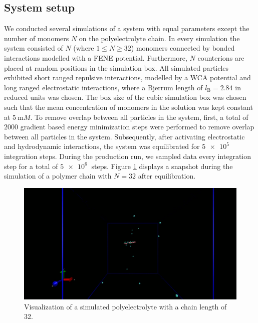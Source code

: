 \subsection{System setup}
We conducted several simulations of a system with equal parameters except the number of monomers $N$ on the polyelectrolyte chain. In every simulation the system consisted of $N$ (where $1\le N \ge 32$) monomers connected by bonded interactions modelled with a FENE potential. Furthermore, $N$ counterions are placed at random positions in the simulation box. All simulated particles exhibited short ranged repulsive interactions, modelled by a WCA potential and long ranged electrostatic interactions, where a Bjerrum length of $l_\text{B} = 2.84$ in reduced units was chosen. The box size of the cubic simulation box was chosen such that the mean concentration of monomers in the solution was kept constant at $\SI{5}{\milli M}$. To remove overlap between all particles in the system, first, a total of $2000$ gradient based energy minimization steps were performed to remove overlap between all particles in the system. Subsequently, after activating electrostatic and hydrodynamic interactions, the system was equilibrated for $\SI{5e5}{}$ integration steps. During the production run, we sampled data every integration step for a total of $\SI{5e6}{}$ steps. Figure \ref{fig:vmd} displays a snapshot during the simulation of a polymer chain with $N=32$ after equilibration.
\begin{figure}[H]
	\centering
	\includegraphics[width=\columnwidth]{Analysis_1/VMD_visualization}
	\captionsetup{width=\columnwidth}
	\caption{Visualization of a simulated polyelectrolyte with a chain length of 32.}
	\label{fig:vmd}
\end{figure}
